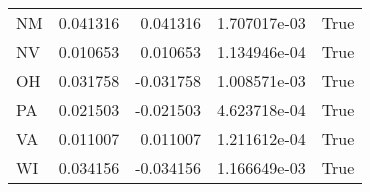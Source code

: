 \begin{table}
\begin{tabular}{lrrrl}
      NM &   0.041316 &  0.041316 &   1.707017e-03 &          True \\
      NV &   0.010653 &  0.010653 &   1.134946e-04 &          True \\
      OH &   0.031758 & -0.031758 &   1.008571e-03 &          True \\
      PA &   0.021503 & -0.021503 &   4.623718e-04 &          True \\
      VA &   0.011007 &  0.011007 &   1.211612e-04 &          True \\
      WI &   0.034156 & -0.034156 &   1.166649e-03 &          True \\
\bottomrule
\end{tabular}
\end{table}
